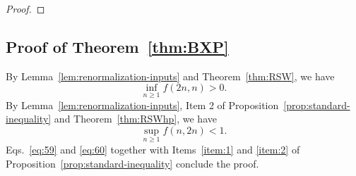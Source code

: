 \documentclass[12pt, twoside,a4paper,reqno]{amsart}
\theoremstyle{plain}
\theoremstyle{remark}
\theoremstyle{definition}
\newcommand{\R}{\mathbb{R}}
\newcommand{\PP}{\mathbf{P}}
\renewcommand{\P}[1]{\PP \left [ #1 \right ]}
\newcommand{\lr}[1][]{\overset{\:#1\:}\longleftrightarrow}
\newcommand{\ol}{\overline}
\begin{document}
\begin{proof}
\end{proof}

\subsection{Proof of Theorem~\protect\ref{thm:BXP}}

\label{sec:proof-theorem1}

By Lemma~\ref{lem:renormalization-inputs} and
Theorem~\ref{thm:RSW}, we  have
\begin{equation}
  \label{eq:59}
  \inf_{n\ge1}f(2n,n)>0.
\end{equation}
By Lemma~\ref{lem:renormalization-inputs}, Item 2 of Proposition~\ref{prop:standard-inequality} and
Theorem~\ref{thm:RSWhp}, we  have
\begin{equation}
\label{eq:60}
  \sup_{n\ge1}f(n,2n)<1.
\end{equation}
Eqs.~\eqref{eq:59} and \eqref{eq:60} together with Items~\ref{item:1} and
\ref{item:2} of Proposition~\ref{prop:standard-inequality} conclude the proof.
\end{document}
